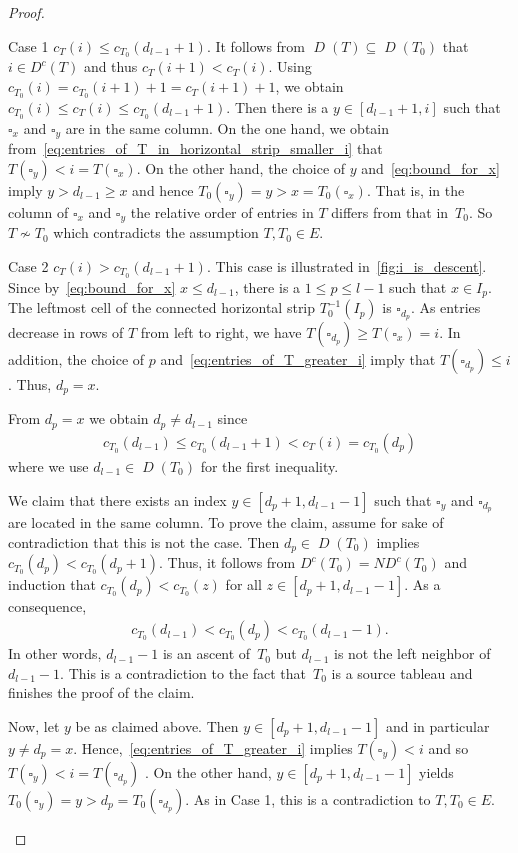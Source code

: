 \documentclass[ALCO,ThmDefs,Unicode,epreuves]{cedram}
\newcommand{\D}{\operatorname{\mathit{D}}}
\newcommand{\DC}{\operatorname{\mathit{D^c}}}
\newcommand{\ND}{\operatorname{\mathit{ND^c}}}
\newcommand{\cell}{\square}
\begin{document}
\begin{proof}
\begin{enonce*}[remark]{Case 1} 
$c_T(i) \leq c_{T_0}(d_{l-1}+1)$. It follows from $\D(T) \subseteq \D(T_0)$ that $i\in \DC(T)$ and thus $c_T(i+1) < c_T(i) $. 
	Using $c_{T_0}(i) = c_{T_0}(i+1) + 1 = c_{T}(i+1) + 1$, we obtain
	$c_{T_0}(i) \leq c_T(i) \leq c_{T_0}(d_{l-1}+1).$
	Then there is a $y\in [d_{l-1}+1, i]$ such that $\cell_x$ and $\cell_y$ are in the same column. 
	On the one hand, we obtain from~\eqref{eq:entries_of_T_in_horizontal_strip_smaller_i} that $T(\cell_y) < i = T(\cell_x)$. 
	On the other hand, the choice of $y$ and~\eqref{eq:bound_for_x} imply $y>d_{l-1} \geq x$ and hence $T_0(\cell_y) =y> x = T_0(\cell_x)$.	
	That is, in the column of $\cell_x$ and $\cell_y$ the relative order of entries in $T$ differs from that in~$T_0$.
	So $T\not \sim T_0$ which contradicts the assumption $T,T_0 \in E$.
	\end{enonce*}
\begin{enonce*}[remark]{Case 2} 
	$c_T(i) > c_{T_0}(d_{l-1}+1)$. This case is illustrated in~\cref{fig:i_is_descent}. Since by~\eqref{eq:bound_for_x} $x\leq d_{l-1}$, there is a $1\leq p\leq l-1$ such that $x\in I_p$.
	The leftmost cell of the connected horizontal strip $T^{-1}_0(I_p)$ is $\cell_{d_p}$. As entries decrease in rows of $T$ from left to right, we have $T(\cell_{d_p})\geq T(\cell_x) = i$. In addition, the choice of $p$ and~\eqref{eq:entries_of_T_greater_i} imply that $T(\cell_{d_p})\leq i$. Thus, $d_p=x$.
	
	From $d_p=x$ we obtain $d_p \neq d_{l-1}$ since
	\begin{align*}
	c_{T_0}(d_{l-1}) \leq c_{T_0}(d_{l-1}+1) < c_T(i) = c_{T_0}(d_p)
	\end{align*}
	where we use $d_{l-1}\in \D(T_0)$ for the first inequality.
	
	We claim that there exists an index $y\in [d_p +1, d_{l-1} -1]$ such that $\cell_y$ and $\cell_{d_p}$ are located in the same column.
	To prove the claim, assume for sake of contradiction that this is not the case. Then $d_p \in \D(T_0)$ implies $ c_{T_0}(d_p)< c_{T_0}(d_p+1)$. Thus, it follows from $\DC(T_0)= \ND(T_0)$ and induction that $c_{T_0}(d_p)< c_{T_0}(z)$ for all ${z\in[d_p+1,d_{l-1} -1]}$. As a consequence,
		\begin{align*}
		c_{T_0}(d_{l-1}) < c_{T_0}(d_p) < c_{T_0}(d_{l-1}-1).
		\end{align*}
		In other words, $d_{l-1}-1$ is an ascent of~$T_0$
		but $d_{l-1}$ is not the left neighbor of $d_{l-1}-1$.	
		 This is a contradiction to the fact that~$T_0$ is a source tableau and finishes the proof of the claim.
	
	Now, let $y$ be as claimed above. Then $y\in [d_p +1, d_{l-1} -1]$ and in particular $y\neq d_p= x$. Hence,~\eqref{eq:entries_of_T_greater_i} implies $T(\cell_y) <i$ and so $T(\cell_y) < i = T(\cell_{d_p})$ . 
 On the other hand, $y\in [d_p +1, d_{l-1} -1]$ yields $T_0(\cell_y) =y > d_p = T_0(\cell_{d_p})$. As in Case 1, this is a contradiction to $T,T_0\in E$.\qedhere
\end{enonce*}
\end{proof}
\end{document}
